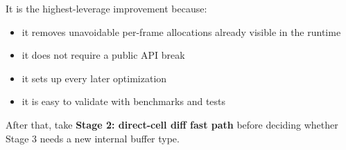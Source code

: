It is the highest-leverage improvement because:

\begin{itemize}
\tightlist
\item
  it removes unavoidable per-frame allocations already visible in the runtime
\item
  it does not require a public API break
\item
  it sets up every later optimization
\item
  it is easy to validate with benchmarks and tests
\end{itemize}

After that, take \textbf{Stage 2: direct-cell diff fast path} before deciding whether Stage 3 needs a new internal buffer type.

